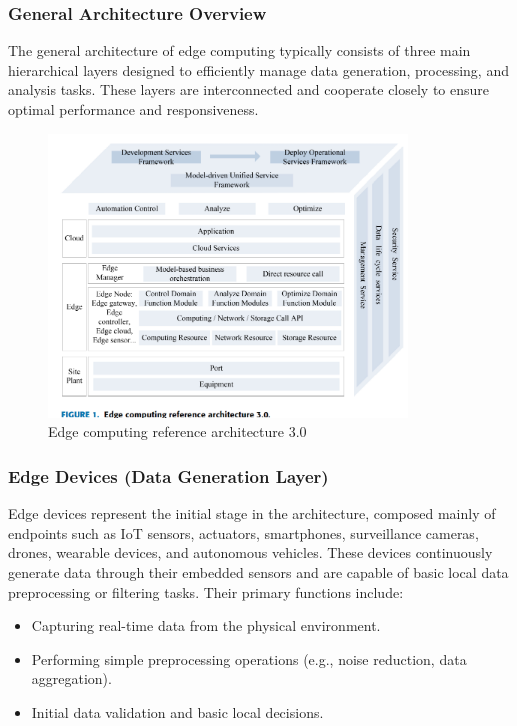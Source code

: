 \documentclass[runningheads]{llncs}
\begin{document}
\subsubsection{General Architecture Overview}
The general architecture of edge computing typically consists of three main hierarchical layers designed to efficiently manage data generation, processing, and analysis tasks. These layers are interconnected and cooperate closely to ensure optimal performance and responsiveness.

\begin{figure}[ht]
    \centering
    \includegraphics[width=0.85\textwidth]{IMG/6.png}
    \caption{Edge computing reference architecture 3.0}
    \label{fig:edge_reference_architecture}
    \end{figure}


\subsubsection{Edge Devices (Data Generation Layer)}
Edge devices represent the initial stage in the architecture, composed mainly of endpoints such as IoT sensors, actuators, smartphones, surveillance cameras, drones, wearable devices, and autonomous vehicles. These devices continuously generate data through their embedded sensors and are capable of basic local data preprocessing or filtering tasks. Their primary functions include:
\begin{itemize}
    \item Capturing real-time data from the physical environment.
    \item Performing simple preprocessing operations (e.g., noise reduction, data aggregation).
    \item Initial data validation and basic local decisions.
\end{itemize}
\end{document}
